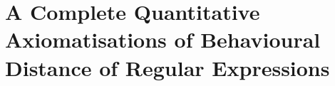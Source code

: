\chapter{A Complete Quantitative Axiomatisations of Behavioural Distance of Regular Expressions}
\label{chapter2}


